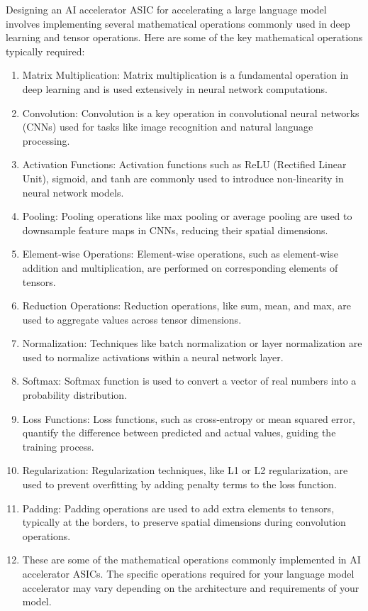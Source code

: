 Designing an AI accelerator ASIC for accelerating a large language model involves implementing several mathematical operations commonly used in deep learning and tensor operations. Here are some of the key mathematical operations typically required:

\begin{enumerate}
\item Matrix Multiplication: Matrix multiplication is a fundamental operation in deep learning and is used extensively in neural network computations.
\item Convolution: Convolution is a key operation in convolutional neural networks (CNNs) used for tasks like image recognition and natural language processing.
\item Activation Functions: Activation functions such as ReLU (Rectified Linear Unit), sigmoid, and tanh are commonly used to introduce non-linearity in neural network models.
\item Pooling: Pooling operations like max pooling or average pooling are used to downsample feature maps in CNNs, reducing their spatial dimensions.
\item Element-wise Operations: Element-wise operations, such as element-wise addition and multiplication, are performed on corresponding elements of tensors.
\item Reduction Operations: Reduction operations, like sum, mean, and max, are used to aggregate values across tensor dimensions.
\item Normalization: Techniques like batch normalization or layer normalization are used to normalize activations within a neural network layer.
\item Softmax: Softmax function is used to convert a vector of real numbers into a probability distribution.
\item Loss Functions: Loss functions, such as cross-entropy or mean squared error, quantify the difference between predicted and actual values, guiding the training process.
\item Regularization: Regularization techniques, like L1 or L2 regularization, are used to prevent overfitting by adding penalty terms to the loss function.
\item Padding: Padding operations are used to add extra elements to tensors, typically at the borders, to preserve spatial dimensions during convolution operations.
\item These are some of the mathematical operations commonly implemented in AI accelerator ASICs. The specific operations required for your language model accelerator may vary depending on the architecture and requirements of your model.
\end{enumerate}